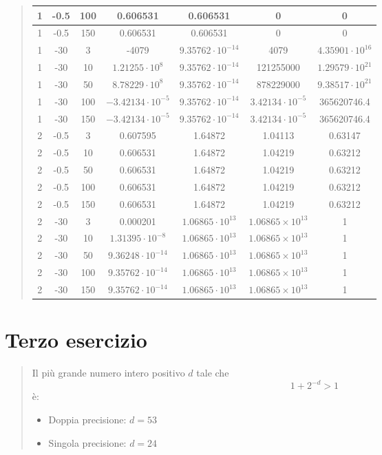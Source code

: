 \documentclass[10pt]{article}
\begin{document}
\begin{quote}
\begin{tabular}{| c | c | c | c | c | c | c |}
        1 & -0.5 & 100 & 0.606531 & 0.606531 & 0 & 0 \\
        \hline
        1 & -0.5 & 150 & 0.606531 & 0.606531 & 0 & 0 \\
        \hline
        1 & -30 & 3 & -4079 & $9.35762\cdot10^{-14}$ & 4079 & $4.35901\cdot10^{16}$ \\
        \hline
        1 & -30 & 10 & $1.21255\cdot10^{8}$ & $9.35762\cdot10^{-14}$ & 121255000 & $1.29579\cdot10^{21}$ \\
        \hline
        1 & -30 & 50 & $8.78229\cdot10^{8}$ & $9.35762\cdot10^{-14}$ & 878229000 & $9.38517\cdot10^{21}$ \\
        \hline
        1 & -30 & 100 & $-3.42134\cdot10^{-5}$ & $9.35762\cdot10^{-14}$ & $3.42134\cdot10^{-5}$ & 365620746.4\\
        \hline
        1 & -30 & 150 & $-3.42134\cdot10^{-5}$ & $9.35762\cdot10^{-14}$ & $3.42134\cdot10^{-5}$ & 365620746.4 \\
        \hline
        2 & -0.5 & 3 & 0.607595 & 1.64872 & 1.04113 & 0.63147 \\
        \hline
        2 & -0.5 & 10 & 0.606531 & 1.64872 & 1.04219 & 0.63212 \\
        \hline
        2 & -0.5 & 50 & 0.606531 & 1.64872 & 1.04219 & 0.63212 \\
        \hline
        2 & -0.5 & 100 & 0.606531 & 1.64872 & 1.04219 & 0.63212 \\
        \hline
        2 & -0.5 & 150 & 0.606531 & 1.64872 & 1.04219 & 0.63212 \\
        \hline
        2 & -30 & 3 & 0.000201 & $1.06865\cdot10^{13}$ & $1.06865\times10^{13}$ & 1 \\
        \hline
        2 & -30 & 10 & $1.31395\cdot10^{-8}$ & $1.06865\cdot10^{13}$ & $1.06865\times10^{13}$ & 1 \\
        \hline
        2 & -30 & 50 & $9.36248\cdot10^{-14}$ & $1.06865\cdot10^{13}$ & $1.06865\times10^{13}$ & 1 \\
        \hline
        2 & -30 & 100 & $9.35762\cdot10^{-14}$ & $1.06865\cdot10^{13}$ & $1.06865\times10^{13}$ & 1 \\
        \hline
        2 & -30 & 150 & $9.35762\cdot10^{-14}$ & $1.06865\cdot10^{13}$ & $1.06865\times10^{13}$ & 1 \\
        \hline
    \end{tabular}
\end{quote}
\newpage
\section{Terzo esercizio}
\begin{quote}
    Il più grande numero intero positivo $d$ tale che \begin{equation*}
        1+2^{-d} > 1
    \end{equation*}
    è:
    \begin{itemize}
        \item Doppia precisione: $d=53$
        \item Singola precisione: $d=24$
    \end{itemize}
\end{quote}
\end{document}
